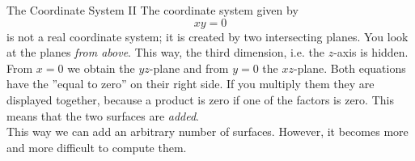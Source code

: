\begin{surferPage}[Coordinates II]{The Coordinate System II}
The coordinate system given by 
\[xy=0\]
is not a real coordinate system; it is created by two intersecting planes. You look at the planes {\it from above}. This way, the third dimension, i.e. the $z$-axis is hidden. \\
\vspace{0.3cm}
From $x=0$ we obtain the $yz$-plane and from  $y=0$ the $xz$-plane.
Both equations have the ''equal to zero'' on their right side. If you multiply them they are displayed together, because a product is zero if one of the factors is zero. This means that the two surfaces are {\it added}. \\
This way we can add an arbitrary number of surfaces. However, it becomes more and more difficult to compute them.
\end{surferPage}
